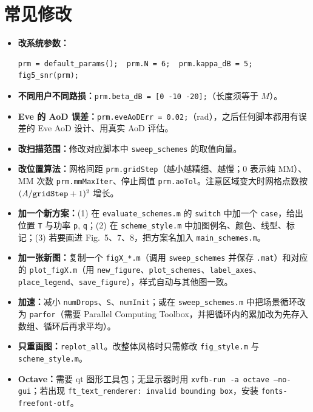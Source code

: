 \documentclass[11pt,a4paper]{ctexart}
\newcommand{\code}[1]{\texttt{#1}}
\begin{document}
\section{常见修改}
\begin{itemize}
\item \textbf{改系统参数：}
\begin{lstlisting}
prm = default_params();  prm.N = 6;  prm.kappa_dB = 5;
fig5_snr(prm);
\end{lstlisting}
\item \textbf{不同用户不同路损：}\code{prm.beta\_dB = [0 -10 -20];}（长度须等于 $M$）。
\item \textbf{Eve 的 AoD 误差：}\code{prm.eveAoDErr = 0.02;}（rad），之后任何脚本都用有误差的 Eve AoD 设计、用真实 AoD 评估。
\item \textbf{改扫描范围：}修改对应脚本中 \code{sweep\_schemes} 的取值向量。
\item \textbf{改位置算法：}网格间距 \code{prm.gridStep}（越小越精细、越慢；0 表示纯 MM）、MM 次数 \code{prm.mmMaxIter}、停止阈值 \code{prm.aoTol}。注意区域变大时网格点数按 $(A/{\tt gridStep}+1)^2$ 增长。
\item \textbf{加一个新方案：}(1) 在 \code{evaluate\_schemes.m} 的 \code{switch} 中加一个 \code{case}，给出位置 \code{T} 与功率 \code{p}, \code{q}；(2) 在 \code{scheme\_style.m} 中加图例名、颜色、线型、标记；(3) 若要画进 Fig.~5、7、8，把方案名加入 \code{main\_schemes.m}。
\item \textbf{加一张新图：}复制一个 \code{figX\_*.m}（调用 \code{sweep\_schemes} 并保存 \code{.mat}）和对应的 \code{plot\_figX.m}（用 \code{new\_figure}、\code{plot\_schemes}、\code{label\_axes}、\code{place\_legend}、\code{save\_figure}），样式自动与其他图一致。
\item \textbf{加速：}减小 \code{numDrops}、\code{S}、\code{numInit}；或在 \code{sweep\_schemes.m} 中把场景循环改为 \code{parfor}（需要 Parallel Computing Toolbox，并把循环内的累加改为先存入数组、循环后再求平均）。
\item \textbf{只重画图：}\code{replot\_all}。改整体风格时只需修改 \code{fig\_style.m} 与 \code{scheme\_style.m}。
\item \textbf{Octave：}需要 qt 图形工具包；无显示器时用 \code{xvfb-run -a octave --no-gui}；若出现 \code{ft\_text\_renderer: invalid bounding box}，安装 \code{fonts-freefont-otf}。
\end{itemize}

\end{document}

